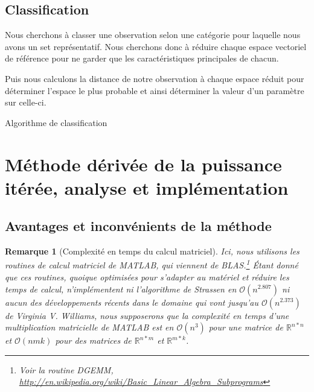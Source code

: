 \documentclass[a4paper,12pt]{article}
\newtheorem*{remark}{Remarque}
\begin{document}
    \subsection{Classification}

        Nous cherchons à classer une observation selon une catégorie pour
        laquelle nous avons un set représentatif. Nous cherchons donc à réduire
        chaque espace vectoriel de référence pour ne garder que les
        caractéristiques principales de chacun.

        Puis nous calculons la distance de notre observation à chaque espace
        réduit pour déterminer l'espace le plus probable et ainsi déterminer la
        valeur d'un paramètre sur celle-ci.


        \begin{algorithm}
            \DontPrintSemicolon
            \caption{Algorithme de classification}
        \end{algorithm}

\section{Méthode dérivée de la puissance itérée, analyse et implémentation}

    \subsection{Avantages et inconvénients de la méthode}

        \begin{remark}[Complexité en temps du calcul matriciel]
        Ici, nous utilisons les routines de calcul matriciel de MATLAB, qui
        viennent de BLAS.\footnote{Voir la routine DGEMM,
        \url{http://en.wikipedia.org/wiki/Basic_Linear_Algebra_Subprograms}}
        Étant donné que ces routines, quoique optimisées pour s'adapter au
        matériel et réduire les temps de calcul, n'implémentent ni l'algorithme
        de Strassen en $\mathcal{O}(n^{2.807})$ ni aucun des développements
        récents dans le domaine qui vont jusqu'au $\mathcal{O}(n^{2.373})$ de
        Virginia V. Williams, nous supposerons que la complexité en temps d'une
        multiplication matricielle de MATLAB est en $\mathcal{O}(n^3)$ pour une
        matrice de $\mathbb{R}^{n*n}$ et $\mathcal{O}(nmk)$ pour des matrices de
        $\mathbb{R}^{n*m}$ et $\mathbb{R}^{m*k}$.
        \end{remark}
\end{document}
